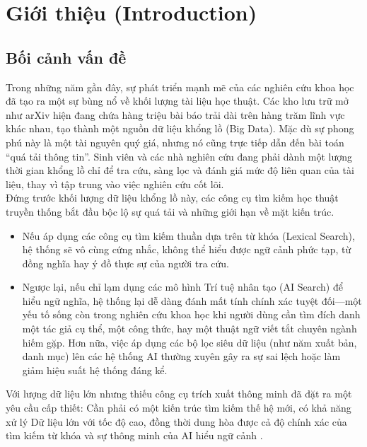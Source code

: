 \chapter{Giới thiệu (Introduction)}

\section{Bối cảnh vấn đề}
Trong những năm gần đây, sự phát triển mạnh mẽ của các nghiên cứu khoa học đã tạo ra một sự bùng nổ về khối lượng tài liệu học thuật. Các kho lưu trữ mở như arXiv hiện đang chứa hàng triệu bài báo trải dài trên hàng trăm lĩnh vực khác nhau, tạo thành một nguồn dữ liệu khổng lồ (Big Data). Mặc dù sự phong phú này là một tài nguyên quý giá, nhưng nó cũng trực tiếp dẫn đến bài toán ``quá tải thông tin''. Sinh viên và các nhà nghiên cứu đang phải dành một lượng thời gian khổng lồ chỉ để tra cứu, sàng lọc và đánh giá mức độ liên quan của tài liệu, thay vì tập trung vào việc nghiên cứu cốt lõi.\\

Đứng trước khối lượng dữ liệu khổng lồ này, các công cụ tìm kiếm học thuật truyền thống bắt đầu bộc lộ sự quá tải và những giới hạn về mặt kiến trúc.\\
\begin{itemize}
    \item Nếu áp dụng các công cụ tìm kiếm thuần dựa trên từ khóa (Lexical Search), hệ thống sẽ vô cùng cứng nhắc, không thể hiểu được ngữ cảnh phức tạp, từ đồng nghĩa hay ý đồ thực sự của người tra cứu.
    \item Ngược lại, nếu chỉ lạm dụng các mô hình Trí tuệ nhân tạo (AI Search) để hiểu ngữ nghĩa, hệ thống lại dễ dàng đánh mất tính chính xác tuyệt đối---một yếu tố sống còn trong nghiên cứu khoa học khi người dùng cần tìm đích danh một tác giả cụ thể, một công thức, hay một thuật ngữ viết tắt chuyên ngành hiếm gặp. Hơn nữa, việc áp dụng các bộ lọc siêu dữ liệu (như năm xuất bản, danh mục) lên các hệ thống AI thường xuyên gây ra sự sai lệch hoặc làm giảm hiệu suất hệ thống đáng kể.
\end{itemize}
Với lượng dữ liệu lớn nhưng thiếu công cụ trích xuất thông minh đã đặt ra một yêu cầu cấp thiết: Cần phải có một kiến trúc tìm kiếm thế hệ mới, có khả năng xử lý Dữ liệu lớn với tốc độ cao, đồng thời dung hòa được cả độ chính xác của tìm kiếm từ khóa và sự thông minh của AI hiểu ngữ cảnh \cite{manning2008ir}.

